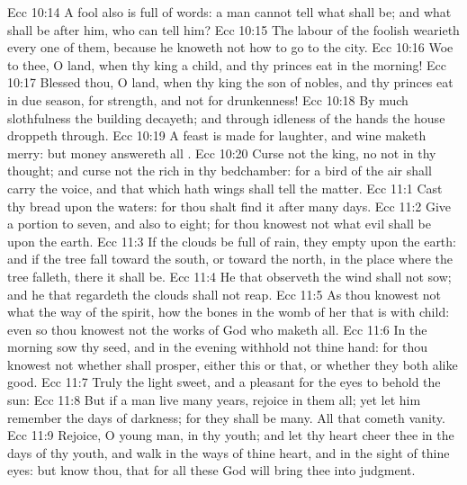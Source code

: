 \vs Ecc 10:14 A fool also is full of words: a man cannot tell what shall be; and what shall be after him, who can tell him?
\vs Ecc 10:15 The labour of the foolish wearieth every one of them, because he knoweth not how to go to the city.
\vs Ecc 10:16 Woe to thee, O land, when thy king  a child, and thy princes eat in the morning!
\vs Ecc 10:17 Blessed  thou, O land, when thy king  the son of nobles, and thy princes eat in due season, for strength, and not for drunkenness!
\vs Ecc 10:18 By much slothfulness the building decayeth; and through idleness of the hands the house droppeth through.
\vs Ecc 10:19 A feast is made for laughter, and wine maketh merry: but money answereth all .
\vs Ecc 10:20 Curse not the king, no not in thy thought; and curse not the rich in thy bedchamber: for a bird of the air shall carry the voice, and that which hath wings shall tell the matter.
\vs Ecc 11:1 Cast thy bread upon the waters: for thou shalt find it after many days.
\vs Ecc 11:2 Give a portion to seven, and also to eight; for thou knowest not what evil shall be upon the earth.
\vs Ecc 11:3 If the clouds be full of rain, they empty  upon the earth: and if the tree fall toward the south, or toward the north, in the place where the tree falleth, there it shall be.
\vs Ecc 11:4 He that observeth the wind shall not sow; and he that regardeth the clouds shall not reap.
\vs Ecc 11:5 As thou knowest not what  the way of the spirit,  how the bones  in the womb of her that is with child: even so thou knowest not the works of God who maketh all.
\vs Ecc 11:6 In the morning sow thy seed, and in the evening withhold not thine hand: for thou knowest not whether shall prosper, either this or that, or whether they both  alike good.
\vs Ecc 11:7 Truly the light  sweet, and a pleasant  for the eyes to behold the sun:
\vs Ecc 11:8 But if a man live many years,  rejoice in them all; yet let him remember the days of darkness; for they shall be many. All that cometh  vanity.
\vs Ecc 11:9 Rejoice, O young man, in thy youth; and let thy heart cheer thee in the days of thy youth, and walk in the ways of thine heart, and in the sight of thine eyes: but know thou, that for all these  God will bring thee into judgment.
